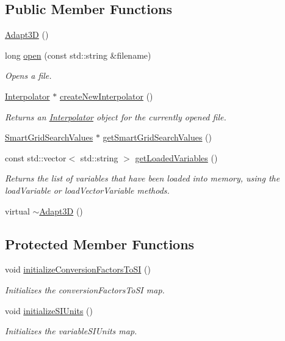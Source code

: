 \subsection*{Public Member Functions}
\begin{DoxyCompactItemize}
\item 
\hyperlink{classccmc_1_1_adapt3_d_aa3927c68c63cde9e4006c0f8687116cb}{Adapt3\-D} ()
\item 
long \hyperlink{classccmc_1_1_adapt3_d_a02a5f2b5ba26cacd93f7c41c68c4b24a}{open} (const std\-::string \&filename)
\begin{DoxyCompactList}\small\item\em Opens a file.  \end{DoxyCompactList}\item 
\hyperlink{classccmc_1_1_interpolator}{Interpolator} $\ast$ \hyperlink{classccmc_1_1_adapt3_d_a4a82029cb4669a788c7ffa555fa4c20f}{create\-New\-Interpolator} ()
\begin{DoxyCompactList}\small\item\em Returns an \hyperlink{classccmc_1_1_interpolator}{Interpolator} object for the currently opened file.  \end{DoxyCompactList}\item 
\hyperlink{structccmc_1_1_smart_grid_search_values}{Smart\-Grid\-Search\-Values} $\ast$ \hyperlink{classccmc_1_1_adapt3_d_aba33c6663d647dc3d00e9007c909a7ed}{get\-Smart\-Grid\-Search\-Values} ()
\item 
const std\-::vector$<$ std\-::string $>$ \hyperlink{classccmc_1_1_adapt3_d_a0e69d88334151e8ac9b2cbb7dc546e64}{get\-Loaded\-Variables} ()
\begin{DoxyCompactList}\small\item\em Returns the list of variables that have been loaded into memory, using the load\-Variable or load\-Vector\-Variable methods. \end{DoxyCompactList}\item 
virtual \hyperlink{classccmc_1_1_adapt3_d_ac27c4556b1091bf63e5931ecadb37462}{$\sim$\-Adapt3\-D} ()
\end{DoxyCompactItemize}
\subsection*{Protected Member Functions}
\begin{DoxyCompactItemize}
\item 
void \hyperlink{classccmc_1_1_adapt3_d_aa4f0803514d069d146fdf58691b82d7a}{initialize\-Conversion\-Factors\-To\-S\-I} ()
\begin{DoxyCompactList}\small\item\em Initializes the conversion\-Factors\-To\-S\-I map.  \end{DoxyCompactList}\item 
void \hyperlink{classccmc_1_1_adapt3_d_a00d25fcceb69cc274df1c5e671f620e5}{initialize\-S\-I\-Units} ()
\begin{DoxyCompactList}\small\item\em Initializes the variable\-S\-I\-Units map.  \end{DoxyCompactList}\end{DoxyCompactItemize}

